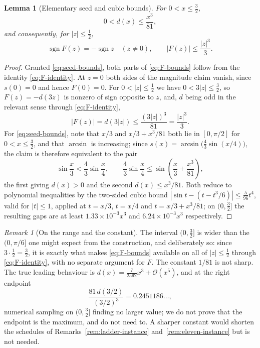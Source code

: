 \documentclass[12pt]{article}
\newtheorem{lemma}[theorem]{Lemma}
\theoremstyle{definition}
\theoremstyle{remark}
\newtheorem{remark}[theorem]{Remark}
\newcommand{\abs}[1]{\left|#1\right|}
\newcommand{\Order}{\mathcal{O}}
\begin{document}
\begin{lemma}[Elementary seed and cubic bounds]
\label{lem:seed-bounds}
For $0<x\le\tfrac32$,
\begin{equation}
  0<d(x)\le\frac{x^3}{81},
  \label{eq:seed-bounds}
\end{equation}
and consequently, for $\abs z\le\tfrac12$,
\begin{equation}
  \operatorname{sgn}F(z)=-\operatorname{sgn}z\quad(z\ne0),
  \qquad
  \abs{F(z)}\le\frac{\abs z^3}{3}.
  \label{eq:F-bounds}
\end{equation}
\end{lemma}

\begin{proof}
Granted \eqref{eq:seed-bounds}, both parts of \eqref{eq:F-bounds} follow from
the identity \eqref{eq:F-identity}.  At $z=0$ both sides of the magnitude claim
vanish, since $s(0)=0$ and hence $F(0)=0$.  For $0<\abs z\le\tfrac12$ we have
$0<3\abs z\le\tfrac32$, so $F(z)=-d(3z)$ is nonzero of sign opposite to $z$,
and, $d$ being odd in the relevant sense through \eqref{eq:F-identity},
\[
  \abs{F(z)}=d(3\abs z)\le\frac{(3\abs z)^3}{81}=\frac{\abs z^3}{3}.
\]
For \eqref{eq:seed-bounds}, note that $x/3$ and $x/3+x^3/81$ both lie in
$[0,\pi/2]$ for $0<x\le\tfrac32$, and that $\arcsin$ is increasing; since
$s(x)=\arcsin\bigl(\tfrac43\sin(x/4)\bigr)$, the claim is therefore equivalent
to the pair
\begin{equation}
  \sin\frac x3<\frac43\sin\frac x4,
  \qquad
  \frac43\sin\frac x4\le\sin\!\left(\frac x3+\frac{x^3}{81}\right),
  \label{eq:two-sine}
\end{equation}
the first giving $d(x)>0$ and the second $d(x)\le x^3/81$.  Both reduce to
polynomial inequalities by the two-sided cubic bound
$\abs{\sin t-(t-t^3/6)}\le\tfrac{5}{96}t^4$, valid for $\abs t\le1$, applied at
$t=x/3$, $t=x/4$ and $t=x/3+x^3/81$; on $(0,\tfrac32]$ the resulting gaps are
at least $1.33\times10^{-3}x^3$ and $6.24\times10^{-3}x^3$ respectively.
\end{proof}

\begin{remark}[On the range and the constant]
\label{rem:seed-range}
The interval $(0,\tfrac32]$ is wider than the $(0,\pi/6]$ one might expect from
the construction, and deliberately so: since $3\cdot\tfrac12=\tfrac32$, it is
exactly what makes \eqref{eq:F-bounds} available on all of $\abs z\le\tfrac12$
through \eqref{eq:F-identity}, with no separate argument for $F$.  The constant
$1/81$ is not sharp.  The true leading behaviour is
$d(x)=\tfrac{7}{2592}x^3+\Order(x^5)$, and at the right endpoint
\[
  \frac{81\,d(3/2)}{(3/2)^3}=0.2451186\ldots,
\]
numerical sampling on $(0,\tfrac32]$ finding no larger value; we do not prove
that the endpoint is the maximum, and do not need to.  A sharper constant would
shorten the schedules of Remarks~\ref{rem:ladder-instance}
and~\ref{rem:eleven-instance} but is not needed.
\end{remark}
\end{document}
